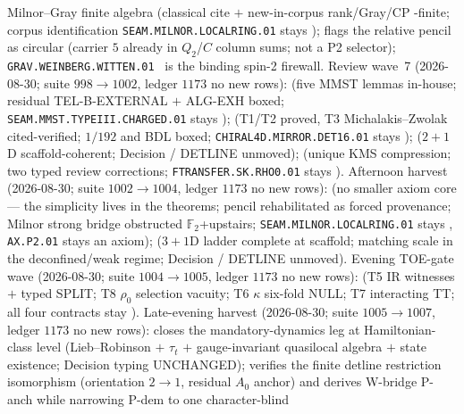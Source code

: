 Milnor--Gray finite algebra (classical cite $+$ new-in-corpus rank/Gray/CP \mE-finite;
corpus identification \texttt{SEAM.MILNOR.LOCALRING.01} stays \mO);
 flags the
relative pencil as circular (carrier $5$ already in $Q_2$/$C$ column sums; not a P2 selector);
\texttt{GRAV.WEINBERG.WITTEN.01} \mO\ is the binding spin-2 firewall.
Review wave~7 (2026-08-30; suite $998\to1002$, ledger $1173$ no new rows):
(five MMST lemmas in-house; residual TEL-B-EXTERNAL $+$ ALG-EXH boxed;
\texttt{SEAM.MMST.TYPEIII.CHARGED.01} stays \mO);
(T1/T2 proved, T3 Michalakis--Zwolak cited-verified; $1/192$ and BDL boxed;
\texttt{CHIRAL4D.MIRROR.DET16.01} stays \mC);
($2{+}1$D scaffold-coherent; Decision / DETLINE unmoved);
(unique KMS compression; two typed review corrections;
\texttt{FTRANSFER.SK.RHO0.01} stays \mO).
Afternoon harvest (2026-08-30; suite $1002\to1004$, ledger $1173$ no new rows):
(no smaller axiom core --- the simplicity lives in the theorems; pencil rehabilitated
as forced provenance; Milnor strong bridge obstructed $\mathbb F_2$+upstairs;
\texttt{SEAM.MILNOR.LOCALRING.01} stays \mO, \texttt{AX.P2.01} stays an axiom);
($3{+}1$D ladder complete at scaffold; matching scale in the deconfined/weak regime;
Decision / DETLINE unmoved).
Evening TOE-gate wave (2026-08-30; suite $1004\to1005$, ledger $1173$ no new rows):
(T5 IR witnesses $+$ typed SPLIT; T8 $\rho_0$ selection vacuity; T6 $\kappa$ six-fold NULL;
T7 interacting TT; all four contracts stay \mO).
Late-evening harvest (2026-08-30; suite $1005\to1007$, ledger $1173$ no new rows):
closes the mandatory-dynamics leg at Hamiltonian-class level (Lieb--Robinson $+$ $\tau_t$ $+$
gauge-invariant quasilocal algebra $+$ state existence; Decision typing UNCHANGED);
verifies the finite detline restriction isomorphism (orientation $2\to1$, residual $A_0$
anchor) and derives W-bridge P-anch while narrowing P-dem to one character-blind
